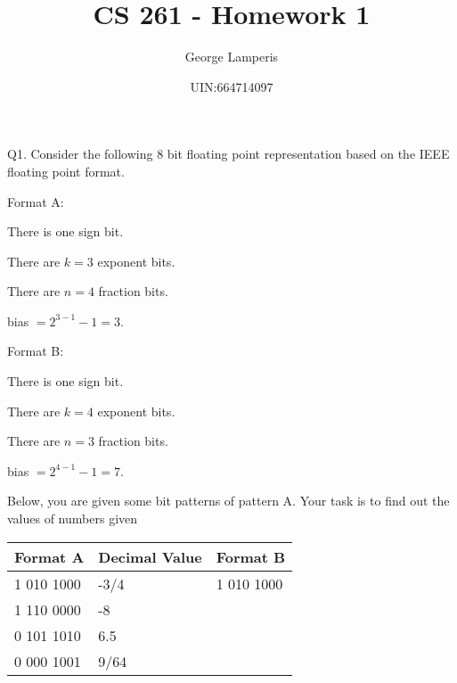 \documentclass[letterpaper, 11pt]{article}
\title{CS 261 - Homework 1}
\author{George Lamperis}
\date{UIN:664714097}
\theoremstyle{mystyle}
\begin{document}
\maketitle

\section{}
Q1. Consider the following 8 bit floating point representation based on the IEEE floating point
format.

Format A:
\begin{compactitem}
    \item There is one sign bit.
    \item There are $k=3$ exponent bits.
    \item There are $n=4$ fraction bits.
    \item bias $= 2^{3-1}-1 = 3 $.
\end{compactitem}

Format B:
\begin{compactitem}
    \item There is one sign bit.
    \item There are $k=4$ exponent bits.
    \item There are $n=3$ fraction bits.
    \item bias $= 2^{4-1}-1 = 7 $.

\end{compactitem}
Below, you are given some bit patterns of pattern A. Your task is to find out the values of numbers given

\begin{tabular}{M|M|M}
    Format A    & Decimal Value     & Format B    \\  010 1000  &  -3/4             & 1 010 1000  \\ 
    1 110 0000  &  -8               &             \\ 
    0 101 1010  &  6.5              &             \\
    0 000 1001  &  9/64             &             \\
\end{tabular}


\end{document}
